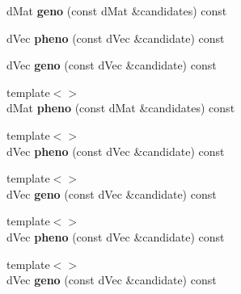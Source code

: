 \begin{DoxyCompactItemize}
\item 
\hypertarget{classlibcmaes_1_1GenoPheno_aa5b36c6f0b48806af87ce202b2427179}{d\-Mat {\bfseries geno} (const d\-Mat \&candidates) const }\label{classlibcmaes_1_1GenoPheno_aa5b36c6f0b48806af87ce202b2427179}

\item 
\hypertarget{classlibcmaes_1_1GenoPheno_adb90d40934c9eb6fd05eff7631734f46}{d\-Vec {\bfseries pheno} (const d\-Vec \&candidate) const }\label{classlibcmaes_1_1GenoPheno_adb90d40934c9eb6fd05eff7631734f46}

\item 
\hypertarget{classlibcmaes_1_1GenoPheno_a8a82e0e53e09403637f9f085b07fa08b}{d\-Vec {\bfseries geno} (const d\-Vec \&candidate) const }\label{classlibcmaes_1_1GenoPheno_a8a82e0e53e09403637f9f085b07fa08b}

\item 
\hypertarget{classlibcmaes_1_1GenoPheno_a3f4c3ea1900be14cb8fa11c306562790}{{\footnotesize template$<$$>$ }\\d\-Mat {\bfseries pheno} (const d\-Mat \&candidates) const}\label{classlibcmaes_1_1GenoPheno_a3f4c3ea1900be14cb8fa11c306562790}

\item 
\hypertarget{classlibcmaes_1_1GenoPheno_abab017b9d581575b81b2e0e09da86d64}{{\footnotesize template$<$$>$ }\\d\-Vec {\bfseries pheno} (const d\-Vec \&candidate) const}\label{classlibcmaes_1_1GenoPheno_abab017b9d581575b81b2e0e09da86d64}

\item 
\hypertarget{classlibcmaes_1_1GenoPheno_a5179951748808e74319482bc18c06af9}{{\footnotesize template$<$$>$ }\\d\-Vec {\bfseries geno} (const d\-Vec \&candidate) const}\label{classlibcmaes_1_1GenoPheno_a5179951748808e74319482bc18c06af9}

\item 
\hypertarget{classlibcmaes_1_1GenoPheno_acbd977770e9b0395a14951c5e05c4949}{{\footnotesize template$<$$>$ }\\d\-Vec {\bfseries pheno} (const d\-Vec \&candidate) const}\label{classlibcmaes_1_1GenoPheno_acbd977770e9b0395a14951c5e05c4949}

\item 
\hypertarget{classlibcmaes_1_1GenoPheno_a58481a077a9b020b5b932668c94b41d3}{{\footnotesize template$<$$>$ }\\d\-Vec {\bfseries geno} (const d\-Vec \&candidate) const}\label{classlibcmaes_1_1GenoPheno_a58481a077a9b020b5b932668c94b41d3}


\end{DoxyCompactItemize}

